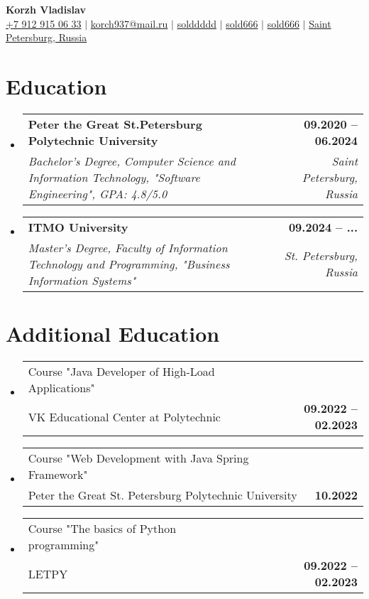 \documentclass[a4paper,9pt]{report}
\makeatletter
\newcommand{\resumeSubheading}[4]{
    \vspace{-2pt}\item
    \begin{tabular*}{1.0\textwidth}[t]{l@{\extracolsep{\fill}}r}
        \textbf{\normalsize#1} & \textbf{\small #2} \\
        \textit{\normalsize#3} & \textit{\small #4} \\

    \end{tabular*}\vspace{-7pt}
}
\newcommand{\resumeSubheadingAdditional}[2]{
    \vspace{-2pt}\item
    \begin{tabular*}{1.0\textwidth}[t]{l@{\extracolsep{\fill}}r}
        \normalsize#1 & \textbf{\small #2} \\

    \end{tabular*}\vspace{-7pt}
}
\newcommand{\resumeSubHeadingListStart}{\begin{itemize}[leftmargin=0.0in, label={}]}
\newcommand{\resumeSubHeadingListEnd}{\end{itemize}}
\makeatother
\begin{document}
\begin{center}
\textbf{\huge Korzh Vladislav} \\ \vspace{5pt}
\small
\textcolor{YellowGreen}{\faMobile} \hspace{.5pt} \href{tel:+79129150633}{+7 912 915 06 33}
$|$
\textcolor{YellowGreen}{\faAt} \hspace{.5pt} \href{mailto:korch937@mail.ru}{korch937@mail.ru}
$|$
\textcolor{YellowGreen}{\faTelegram} \hspace{.5pt} \href{https://t.me/solddddd}{solddddd}
$|$
\textcolor{YellowGreen}{\faLinkedin} \hspace{.5pt} \href{https://www.linkedin.com/in/sold666/}{sold666}
$|$
\textcolor{YellowGreen}{\faGithub} \hspace{.5pt} \href{https://github.com/sold666}{sold666}
$|$
\textcolor{YellowGreen}{\faMapMarker} \hspace{.5pt} \href{https://maps.app.goo.gl/VvvW63dZxLZH6iVR6}{Saint Petersburg, Russia}
\end{center}

\section{Education}
\resumeSubHeadingListStart
\resumeSubheading
{Peter the Great St.Petersburg Polytechnic University}{09.2020 -- 06.2024}
{Bachelor's Degree, Computer Science and Information Technology, "Software Engineering", GPA: 4.8/5.0}{Saint Petersburg, Russia}

\resumeSubheading
{ITMO University}{09.2024 -- ...}
{Master's Degree, Faculty of Information Technology and Programming, "Business Information Systems"}{St. Petersburg, Russia}
\resumeSubHeadingListEnd

\section{Additional Education}
\resumeSubHeadingListStart
\resumeSubheadingAdditional
{Course "Java Developer of High-Load Applications" \\ VK Educational Center at Polytechnic}{09.2022 -- 02.2023}
\resumeSubHeadingListEnd

\resumeSubHeadingListStart
\resumeSubheadingAdditional
{Course "Web Development with Java Spring Framework" \\ Peter the Great St. Petersburg Polytechnic University}{10.2022}
\resumeSubHeadingListEnd

\resumeSubHeadingListStart
\resumeSubheadingAdditional
{Course "The basics of Python programming" \\ LETPY}{09.2022 -- 02.2023}
\resumeSubHeadingListEnd
\end{document}
